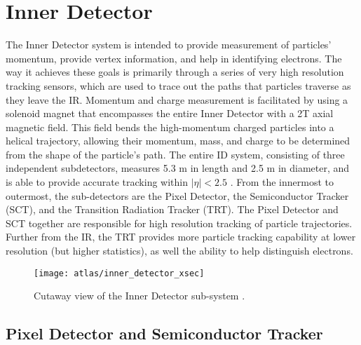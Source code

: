 \section{Inner Detector} \label{sec:inner_detector}
    
    The Inner Detector system is intended to provide measurement of particles' momentum, provide vertex information, and help in identifying electrons.
    The way it achieves these goals is primarily through a series of very high resolution tracking sensors, which are used to trace out the paths that particles traverse as they leave the IR. 
    Momentum and charge measurement is facilitated by using a solenoid magnet that encompasses the entire Inner Detector with a 2T axial magnetic field.
    This field bends the high-momentum charged particles into a helical trajectory, allowing their momentum, mass, and charge to be determined from the shape of the particle's path.
    The entire ID system, consisting of three independent subdetectors, measures 5.3 m in length and 2.5 m in diameter,
        and is able to provide accurate tracking within $|\eta| < 2.5$ \cite{id_tdr}.
    From the innermost to outermost, the sub-detectors are the Pixel Detector, the Semiconductor Tracker (SCT),
        and the Transition Radiation Tracker (TRT).
    The Pixel Detector and SCT together are responsible for high resolution tracking of particle trajectories.
    Further from the IR, the TRT provides more particle tracking capability at lower resolution (but higher statistics), as well the ability to help distinguish electrons. 

    \begin{figure}[h] \centering
        \texttt{[image: atlas/inner\_detector\_xsec]}
        \caption{Cutaway view of the Inner Detector sub-system \cite{atlas_tdr}.}
        \label{fig:inner_detector_xsec}
    \end{figure}

    


    \subsection{Pixel Detector and Semiconductor Tracker}

